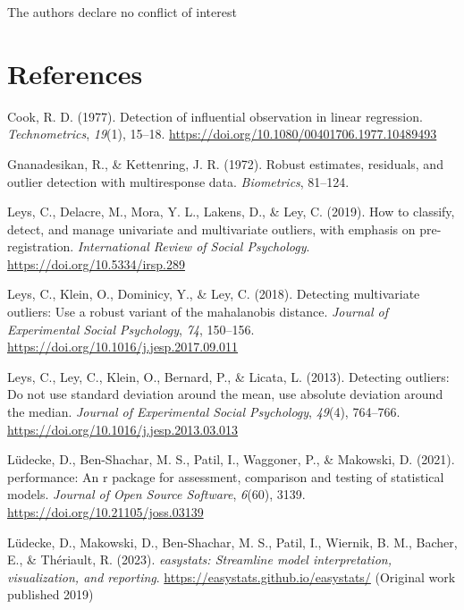 \documentclass{article}
\newlength{\cslhangindent}
\newlength{\cslentryspacingunit} %
\newenvironment{CSLReferences}[2] %
 {%
  \setlength{\parindent}{0pt}
  \ifodd #1
  \let\oldpar\par
  \def\par{\hangindent=\cslhangindent\oldpar}
  \fi
  \setlength{\parskip}{#2\cslentryspacingunit}
 }%
 {}
\begin{document}
The authors declare no conflict of interest

\hypertarget{references}{%
\section*{References}\label{references}}

\hypertarget{refs}{}
\begin{CSLReferences}{1}{0}
\leavevmode{}%
Cook, R. D. (1977). Detection of influential observation in linear
regression. \emph{Technometrics}, \emph{19}(1), 15--18.
\url{https://doi.org/10.1080/00401706.1977.10489493}

\leavevmode{}%
Gnanadesikan, R., \& Kettenring, J. R. (1972). Robust estimates,
residuals, and outlier detection with multiresponse data.
\emph{Biometrics}, 81--124.

\leavevmode{}%
Leys, C., Delacre, M., Mora, Y. L., Lakens, D., \& Ley, C. (2019). How
to classify, detect, and manage univariate and multivariate outliers,
with emphasis on pre-registration. \emph{International Review of Social
Psychology}. \url{https://doi.org/10.5334/irsp.289}

\leavevmode{}%
Leys, C., Klein, O., Dominicy, Y., \& Ley, C. (2018). Detecting
multivariate outliers: Use a robust variant of the mahalanobis distance.
\emph{Journal of Experimental Social Psychology}, \emph{74}, 150--156.
\url{https://doi.org/10.1016/j.jesp.2017.09.011}

\leavevmode{}%
Leys, C., Ley, C., Klein, O., Bernard, P., \& Licata, L. (2013).
Detecting outliers: Do not use standard deviation around the mean, use
absolute deviation around the median. \emph{Journal of Experimental
Social Psychology}, \emph{49}(4), 764--766.
\url{https://doi.org/10.1016/j.jesp.2013.03.013}

\leavevmode{}%
Lüdecke, D., Ben-Shachar, M. S., Patil, I., Waggoner, P., \& Makowski,
D. (2021). {performance}: An r package for assessment, comparison and
testing of statistical models. \emph{Journal of Open Source Software},
\emph{6}(60), 3139. \url{https://doi.org/10.21105/joss.03139}

\leavevmode{}%
Lüdecke, D., Makowski, D., Ben-Shachar, M. S., Patil, I., Wiernik, B.
M., Bacher, E., \& Thériault, R. (2023). \emph{{easystats}: Streamline
model interpretation, visualization, and reporting}.
\url{https://easystats.github.io/easystats/} (Original work published
2019)


\end{CSLReferences}
\end{document}
